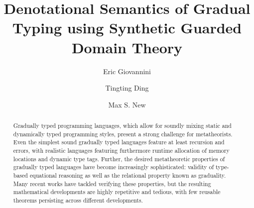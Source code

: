 \documentclass[acmsmall,anonymous,review,screen]{acmart}
\theoremstyle{remark}
\begin{document}
\title{Denotational Semantics of Gradual Typing using Synthetic Guarded Domain Theory}
\author{Eric Giovannini}

\author{Tingting Ding}

\author{Max S. New}

\begin{abstract}
  Gradually typed programming languages, which allow for soundly
  mixing static and dynamically typed programming styles, present a
  strong challenge for metatheorists. Even the simplest sound
  gradually typed languages feature at least recursion and errors,
  with realistic languages featuring furthermore runtime allocation of
  memory locations and dynamic type tags. Further, the desired
  metatheoretic properties of gradually typed languages have become
  increasingly sophisticated: validity of type-based equational
  reasoning as well as the relational property known as
  graduality. Many recent works have tackled verifying these
  properties, but the resulting mathematical developments are highly
  repetitive and tedious, with few reusable theorems persisting across
  different developments.


\end{abstract}
\end{document}
